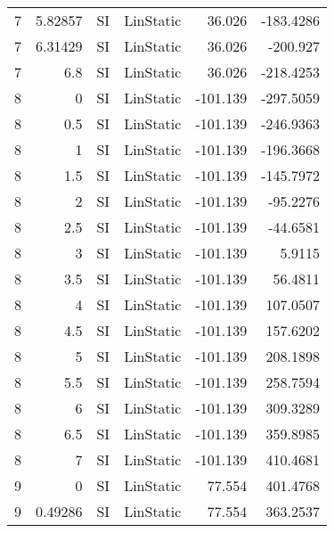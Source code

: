 \begin{table}[htbp]
{\begin{tabular}{rrrlrr}
    \multicolumn{1}{l}{7} & 5.82857 & \multicolumn{1}{l}{SI} & LinStatic & 36.026 & -183.4286 \\
    \multicolumn{1}{l}{7} & 6.31429 & \multicolumn{1}{l}{SI} & LinStatic & 36.026 & -200.927 \\
    \multicolumn{1}{l}{7} & 6.8 & \multicolumn{1}{l}{SI} & LinStatic & 36.026 & -218.4253 \\
    \multicolumn{1}{l}{8} & 0   & \multicolumn{1}{l}{SI} & LinStatic & -101.139 & -297.5059 \\
    \multicolumn{1}{l}{8} & 0.5 & \multicolumn{1}{l}{SI} & LinStatic & -101.139 & -246.9363 \\
    \multicolumn{1}{l}{8} & 1   & \multicolumn{1}{l}{SI} & LinStatic & -101.139 & -196.3668 \\
    \multicolumn{1}{l}{8} & 1.5 & \multicolumn{1}{l}{SI} & LinStatic & -101.139 & -145.7972 \\
    \multicolumn{1}{l}{8} & 2   & \multicolumn{1}{l}{SI} & LinStatic & -101.139 & -95.2276 \\
    \multicolumn{1}{l}{8} & 2.5 & \multicolumn{1}{l}{SI} & LinStatic & -101.139 & -44.6581 \\
    \multicolumn{1}{l}{8} & 3   & \multicolumn{1}{l}{SI} & LinStatic & -101.139 & 5.9115 \\
    \multicolumn{1}{l}{8} & 3.5 & \multicolumn{1}{l}{SI} & LinStatic & -101.139 & 56.4811 \\
    \multicolumn{1}{l}{8} & 4   & \multicolumn{1}{l}{SI} & LinStatic & -101.139 & 107.0507 \\
    \multicolumn{1}{l}{8} & 4.5 & \multicolumn{1}{l}{SI} & LinStatic & -101.139 & 157.6202 \\
    \multicolumn{1}{l}{8} & 5   & \multicolumn{1}{l}{SI} & LinStatic & -101.139 & 208.1898 \\
    \multicolumn{1}{l}{8} & 5.5 & \multicolumn{1}{l}{SI} & LinStatic & -101.139 & 258.7594 \\
    \multicolumn{1}{l}{8} & 6   & \multicolumn{1}{l}{SI} & LinStatic & -101.139 & 309.3289 \\
    \multicolumn{1}{l}{8} & 6.5 & \multicolumn{1}{l}{SI} & LinStatic & -101.139 & 359.8985 \\
    \multicolumn{1}{l}{8} & 7   & \multicolumn{1}{l}{SI} & LinStatic & -101.139 & 410.4681 \\
    \multicolumn{1}{l}{9} & 0   & \multicolumn{1}{l}{SI} & LinStatic & 77.554 & 401.4768 \\
    \multicolumn{1}{l}{9} & 0.49286 & \multicolumn{1}{l}{SI} & LinStatic & 77.554 & 363.2537 \\

\end{tabular}}
\end{table}
